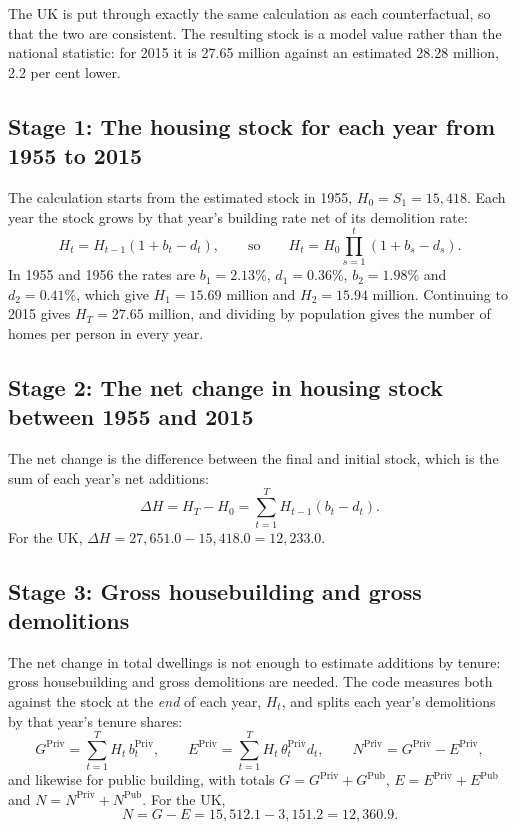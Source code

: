 \documentclass[11pt,a4paper]{article}
\newcommand{\priv}{\mathrm{Priv}}
\newcommand{\pub}{\mathrm{Pub}}
\begin{document}
The UK is put through exactly the same calculation as each counterfactual, so that the
two are consistent. The resulting stock is a model value rather than the national
statistic: for 2015 it is 27.65 million against an estimated 28.28 million, 2.2 per cent
lower.

\subsection*{Stage 1: The housing stock for each year from 1955 to 2015}

The calculation starts from the estimated stock in 1955, $H_0 = S_1 = 15{,}418$. Each
year the stock grows by that year's building rate net of its demolition rate:
\[
  H_t = H_{t-1}(1 + b_t - d_t),
  \qquad\text{so}\qquad
  H_t = H_0 \prod_{s=1}^{t} (1 + b_s - d_s).
\]
In 1955 and 1956 the rates are $b_1 = 2.13\%$, $d_1 = 0.36\%$, $b_2 = 1.98\%$ and
$d_2 = 0.41\%$, which give $H_1 = 15.69$ million and $H_2 = 15.94$ million. Continuing to
2015 gives $H_T = 27.65$ million, and dividing by population gives the number of homes per
person in every year.

\subsection*{Stage 2: The net change in housing stock between 1955 and 2015}

The net change is the difference between the final and initial stock, which is the sum
of each year's net additions:
\[
  \Delta H = H_T - H_0 = \sum_{t=1}^{T} H_{t-1}(b_t - d_t).
\]
For the UK, $\Delta H = 27{,}651.0 - 15{,}418.0 = 12{,}233.0$.

\subsection*{Stage 3: Gross housebuilding and gross demolitions}

The net change in total dwellings is not enough to estimate additions by tenure: gross
housebuilding and gross demolitions are needed. The code measures both against the stock
at the \emph{end} of each year, $H_t$, and splits each year's demolitions by that year's
tenure shares:
\[
  G^{\priv} = \sum_{t=1}^{T} H_t\, b_t^{\priv}, \qquad
  E^{\priv} = \sum_{t=1}^{T} H_t\, \theta_t^{\priv} d_t, \qquad
  N^{\priv} = G^{\priv} - E^{\priv},
\]
and likewise for public building, with totals $G = G^{\priv} + G^{\pub}$,
$E = E^{\priv} + E^{\pub}$ and $N = N^{\priv} + N^{\pub}$. For the UK,
\[
  N = G - E = 15{,}512.1 - 3{,}151.2 = 12{,}360.9.
\]
\end{document}

